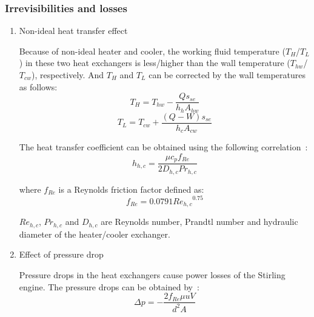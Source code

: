 
\subsubsection{Irrevisibilities and losses}

\begin{enumerate}
\item Non-ideal heat transfer effect

Because of non-ideal heater and cooler, the working fluid temperature ($T_{H}$/$T_L$) in these two heat exchangers is less/higher than the wall temperature ($T_{hw}$/$T_{cw}$), respectively. And $T_{H}$ and $T_{L}$ can be corrected by the wall temperatures as follows:
\begin{equation}
	T_H = T_{hw} - \frac{Qs_{se}}{h_hA_{hw}}
	\label{eq:T_H}
\end{equation}
\begin{equation}
	T_L = T_{cw} + \frac{(Q-W)s_{se}}{h_cA_{cw}}
	\label{eq:T_L}
\end{equation}

The heat transfer coefficient can be obtained using the following correlation~\cite{Babaelahi2015}:
\begin{equation}
	h_{h,c} = \frac{\mu c_pf_{Re}}{2D_{h,c}Pr_{h,c}}
\end{equation}

where $f_{Re}$ is a Reynolds friction factor defined as:
\begin{equation}
	f_{Re} = 0.0791{Re_{h,c}}^{0.75}
\end{equation}

$Re_{h,c}$, $Pr_{h,c}$ and $D_{h,c}$ are Reynolds number, Prandtl number and hydraulic diameter of the heater/cooler exchanger.

\item Effect of pressure drop

Pressure drops in the heat exchangers cause power losses of the Stirling engine. The pressure drops can be obtained by~\cite{Urieli1984}:
\begin{equation}
	\Delta p = -\frac{2f_{Re}\mu u V}{d^2A}
\end{equation}


\end{enumerate}

